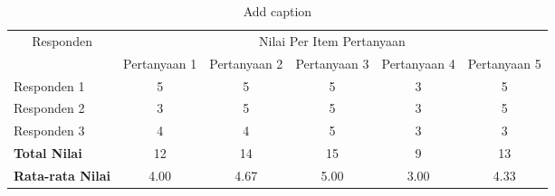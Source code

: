 \begin{table}[htbp]
  \centering
  \caption{Add caption}
    \begin{tabular}{|l|c|c|c|c|c|}
    \toprule
    \multicolumn{1}{|c|}{\multirow{2}[4]{*}{Responden}} & \multicolumn{5}{c|}{Nilai Per Item Pertanyaan} \\
\cmidrule{2-6}          & Pertanyaan 1 & Pertanyaan 2 & Pertanyaan 3 & Pertanyaan 4 & Pertanyaan 5 \\
    \midrule
    Responden 1 & 5     & 5     & 5     & 3     & 5 \\
    \midrule
    Responden 2 & 3     & 5     & 5     & 3     & 5 \\
    \midrule
    Responden 3 & 4     & 4     & 5     & 3     & 3 \\
    \midrule
    \textbf{Total Nilai} & 12    & 14    & 15    & 9     & 13 \\
    \midrule
    \textbf{Rata-rata Nilai} & 4.00  & 4.67  & 5.00  & 3.00  & 4.33 \\
    \bottomrule
    \end{tabular}%
  \label{tab:addlabel}%
\end{table}%
